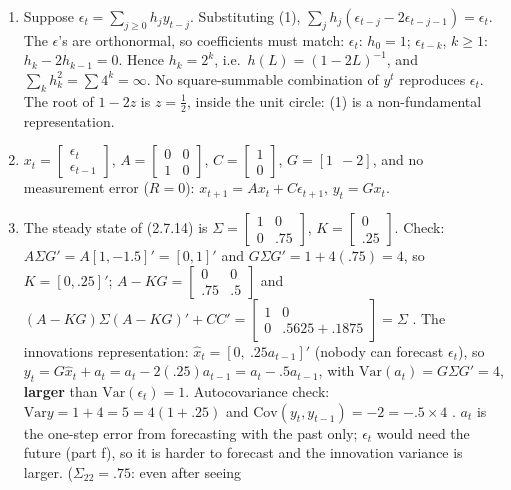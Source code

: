 \documentclass[12pt, letterpaper]{article}
\newcommand{\Var}{\mathrm{Var}}
\newcommand{\Cov}{\mathrm{Cov}}
\begin{document}
\begin{tcolorbox}[evenbox,title={Exercise 2.28 \quad Invertibility}]
\begin{enumerate}
\item Suppose $\epsilon_t=\sum_{j\ge0}h_jy_{t-j}$. Substituting (1),
$\sum_jh_j(\epsilon_{t-j}-2\epsilon_{t-j-1})=\epsilon_t$. The $\epsilon$'s are orthonormal, so
coefficients must match: $\epsilon_t$: $h_0=1$; $\epsilon_{t-k}$, $k\ge1$: $h_k-2h_{k-1}=0$. Hence
$h_k=2^k$, i.e.\ $h(L)=(1-2L)^{-1}$, and $\sum_kh_k^2=\sum4^k=\infty$. No square-summable
combination of $y^t$ reproduces $\epsilon_t$. The root of $1-2z$ is $z=\frac12$, inside the unit circle:
(1) is a non-fundamental representation.
\item $x_t=\begin{bmatrix}\epsilon_t\\ \epsilon_{t-1}\end{bmatrix}$,
$A=\begin{bmatrix}0&0\\1&0\end{bmatrix}$, $C=\begin{bmatrix}1\\0\end{bmatrix}$, $G=[1\ \ -2]$, and no
measurement error ($R=0$): $x_{t+1}=Ax_t+C\epsilon_{t+1}$, $y_t=Gx_t$.
\item The steady state of (2.7.14) is $\Sigma=\begin{bmatrix}1&0\\0&.75\end{bmatrix}$,
$K=\begin{bmatrix}0\\.25\end{bmatrix}$. Check: $A\Sigma G'=A[1,-1.5]'=[0,1]'$ and $G\Sigma G'=1+4(.75)=4$,
so $K=[0,.25]'$; $A-KG=\begin{bmatrix}0&0\\.75&.5\end{bmatrix}$ and
$(A-KG)\Sigma(A-KG)'+CC'=\begin{bmatrix}1&0\\0&.5625+.1875\end{bmatrix}=\Sigma$ \checkmark. The
innovations representation: $\hat x_t=[0,\ .25a_{t-1}]'$ (nobody can forecast $\epsilon_t$), so
$y_t=G\hat x_t+a_t=a_t-2(.25)a_{t-1}=\boxed{a_t-.5a_{t-1}}$, with
$\boxed{\Var(a_t)=G\Sigma G'=4}$, \textbf{larger} than $\Var(\epsilon_t)=1$. Autocovariance check:
$\Var y=1+4=5=4(1+.25)$ and $\Cov(y_t,y_{t-1})=-2=-.5\times4$ \checkmark. $a_t$ is the one-step
error from forecasting with the past only; $\epsilon_t$ would need the future (part f), so it is
harder to forecast and the innovation variance is larger. ($\Sigma_{22}=.75$: even after seeing

\end{enumerate}
\end{tcolorbox}
\end{document}
